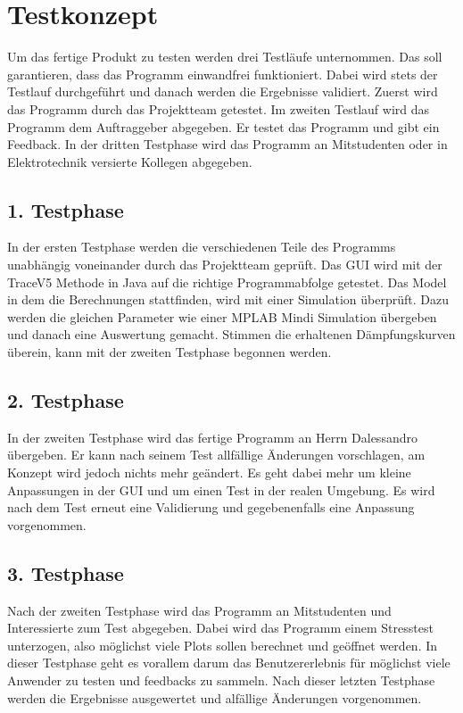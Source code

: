 \section{Testkonzept} \label{sec:Testkonzept}

Um das fertige Produkt zu testen werden drei Testläufe unternommen. Das soll garantieren, dass das Programm einwandfrei funktioniert. Dabei wird stets der Testlauf durchgeführt und danach werden die Ergebnisse validiert. 
Zuerst wird das Programm durch das Projektteam getestet. 
Im zweiten Testlauf wird das Programm dem Auftraggeber abgegeben. Er testet das Programm und gibt ein Feedback. 
In der dritten Testphase wird das Programm an Mitstudenten oder in Elektrotechnik versierte Kollegen abgegeben. 



\subsection{1. Testphase} \label{subsec:1}

In der ersten Testphase werden die verschiedenen Teile des Programms unabhängig voneinander durch das Projektteam geprüft. 
Das GUI wird mit der TraceV5 Methode in Java auf die richtige Programmabfolge getestet.
Das Model in dem die Berechnungen stattfinden, wird mit einer Simulation überprüft. Dazu werden die gleichen Parameter wie einer MPLAB Mindi Simulation übergeben und danach eine Auswertung gemacht. Stimmen die erhaltenen Dämpfungskurven überein, kann mit der zweiten Testphase begonnen werden.

\subsection{2. Testphase} \label{subsec:2}

In der zweiten Testphase wird das fertige Programm an Herrn Dalessandro übergeben. Er kann nach seinem Test allfällige Änderungen vorschlagen, am Konzept wird jedoch nichts mehr geändert. Es geht dabei mehr um kleine Anpassungen in der GUI und um einen Test in der realen Umgebung. Es wird nach dem Test erneut eine Validierung und gegebenenfalls eine Anpassung vorgenommen.
 

\subsection{3. Testphase} \label{subsec:3}

Nach der zweiten Testphase wird das Programm an Mitstudenten und Interessierte zum Test abgegeben. Dabei wird das Programm einem Stresstest unterzogen, also möglichst viele Plots sollen berechnet und geöffnet werden. In dieser Testphase geht es vorallem darum das Benutzererlebnis für möglichst viele Anwender zu testen und feedbacks zu sammeln. Nach dieser letzten Testphase werden die Ergebnisse ausgewertet und alfällige Änderungen vorgenommen.